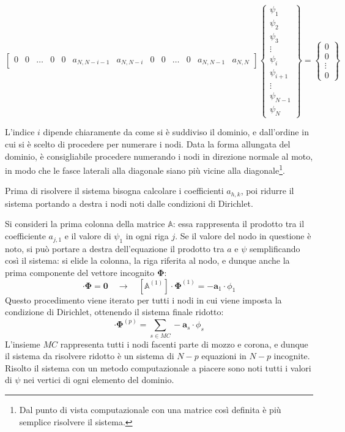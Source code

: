 \documentclass{tufte-handout}
\newcommand{\vect}[1]{\pmb{#1}}
\begin{document}
\begin{fullwidth}
\[\begin{bmatrix}
0            & 0          & \dots      & 0      & 0      & a_{N,N-i-1} & a_{N,N-i}   & 0            & 0      & \dots  & 0      & a_{N,N-1} & a_{N,N}  
        \end{bmatrix}
        \begin{Bmatrix}
            \psi_1       \\
            \psi_2       \\
            \psi_3 \\
            \vdots \\
            \psi_{i} \\
            \psi_{i+1} \\
            \vdots \\
            \psi_{N-1} \\
            \psi_N       
            \end{Bmatrix}
        =
        \begin{Bmatrix}
            0       \\
            0       \\
            \vdots \\
            0       
        \end{Bmatrix}
    \]
\end{fullwidth}

L'indice $i$ dipende chiaramente da come si è suddiviso il dominio, e dall'ordine in cui si è scelto di procedere per numerare i nodi. Data la forma allungata del dominio, è consigliabile procedere numerando i nodi in direzione normale al moto, in modo che le fasce laterali alla diagonale siano più vicine alla diagonale\footnote{Dal punto di vista computazionale con una matrice così definita è più semplice risolvere il sistema.}.

Prima di risolvere il sistema bisogna calcolare i coefficienti $a_{h,k}$, poi ridurre il sistema portando a destra i nodi noti dalle condizioni di Dirichlet.

Si consideri la prima colonna della matrice $\mathbb{A}$: essa rappresenta il prodotto tra il coefficiente $a_{j,1}$ e il valore di $\psi_1$ in ogni riga $j$. Se il valore del nodo in questione è noto, si può portare a destra dell'equazione il prodotto tra $a$ e $\psi$ semplificando così il sistema: si elide la colonna, la riga riferita al nodo, e dunque anche la prima componente del vettore incognito $\vect{\Phi}$:
\begin{equation}
    [\mathbb{A}]\cdot\vect{\Phi}=\vect{0}
    \quad\to\quad
    [\mathbb{A}^{(1)}]\cdot\vect{\Phi}^{(1)}=-\vect{a}_1\cdot\phi_1 
\end{equation}
Questo procedimento viene iterato per tutti i nodi in cui viene imposta la condizione di Dirichlet, ottenendo il sistema finale ridotto:
\begin{equation*}
    [\mathbb{A}^{(p)}]\cdot\vect{\Phi}^{(p)}=\sum_{s\in MC}-\vect{a}_s\cdot\phi_s
\end{equation*}
L'insieme $MC$ rappresenta tutti i nodi facenti parte di mozzo e corona, e dunque il sistema da risolvere ridotto è un sistema di $N-p$ equazioni in $N-p$ incognite.
Risolto il sistema con un metodo computazionale a piacere sono noti tutti i valori di $\psi$ nei vertici di ogni elemento del dominio.
\end{document}
